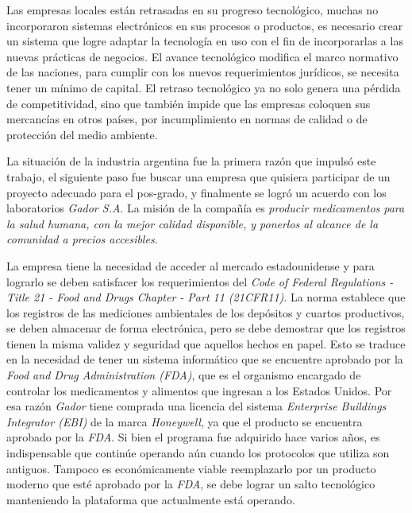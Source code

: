 Las empresas locales están retrasadas en su progreso tecnológico, muchas no incorporaron sistemas electrónicos en sus procesos o productos, es necesario crear un sistema que logre adaptar la tecnología en uso con el fin de incorporarlas a las nuevas prácticas de negocios.
El avance tecnológico modifica el marco normativo de las naciones, para cumplir con los nuevos requerimientos jurídicos, se necesita tener un mínimo de capital.
El retraso tecnológico ya no solo genera una pérdida de competitividad, sino que también impide que las empresas coloquen sus mercancías en otros países, por incumplimiento en normas de calidad o de protección del medio ambiente.
		
La situación de la industria argentina fue la primera razón que impulsó este trabajo, el siguiente paso fue buscar una empresa que quisiera participar de un proyecto adecuado para el pos-grado, y finalmente se logró un acuerdo con los laboratorios \emph{Gador S.A}. La misión de la compañía es \emph{producir medicamentos para la salud humana, con la mejor calidad disponible, y ponerlos al alcance de la comunidad a precios accesibles}.

La empresa tiene la necesidad de acceder al mercado estadounidense y para lograrlo se deben satisfacer los requerimientos del \emph{Code of Federal Regulations - Title 21 - Food and Drugs Chapter - Part 11 (21CFR11)}. La norma establece que los registros de las mediciones ambientales de los depósitos y cuartos productivos, se deben almacenar de forma electrónica, pero se debe demostrar que los registros tienen la misma validez y seguridad que aquellos hechos en papel. Esto se traduce en la necesidad de tener un sistema informático que se encuentre aprobado por la \emph{Food and Drug Administration (FDA)}, que es el organismo encargado de controlar los medicamentos y alimentos que ingresan a los Estados Unidos.
Por esa razón \emph{Gador} tiene comprada una licencia del sistema \emph{Enterprise Buildings Integrator (EBI)} de la marca \emph{Honeywell}, ya que el producto se encuentra aprobado por la \emph{FDA}. 
Si bien el programa fue adquirido hace varios años, es indispensable que continúe operando aún cuando los protocolos que utiliza son antiguos. Tampoco es económicamente viable reemplazarlo por un producto moderno que esté aprobado por la \emph{FDA}, se debe lograr un salto tecnológico manteniendo la plataforma que actualmente está operando.

